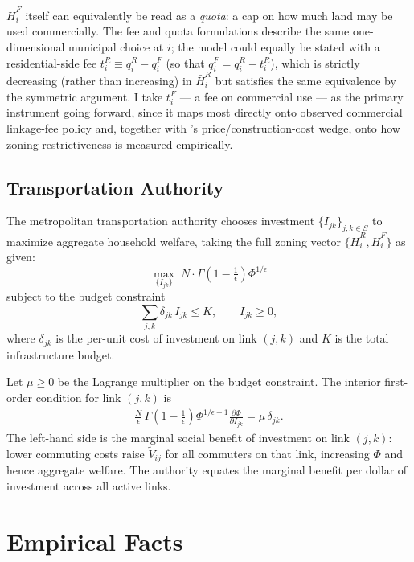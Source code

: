 \documentclass[12pt, a4paper]{article}
\theoremstyle{definition}
\begin{document}
$\bar{H}_i^F$ itself can equivalently be read as a \emph{quota}: a cap on how much land may be used commercially. The fee and quota formulations describe the same one-dimensional municipal choice at $i$; the model could equally be stated with a residential-side fee $t_i^R \equiv q_i^R - q_i^F$ (so that $q_i^F = q_i^R - t_i^R$), which is strictly decreasing (rather than increasing) in $\bar{H}_i^R$ but satisfies the same equivalence by the symmetric argument. I take $t_i^F$ — a fee on commercial use — as the primary instrument going forward, since it maps most directly onto observed commercial linkage-fee policy and, together with \citet{Glaeser2002-vq}'s price/construction-cost wedge, onto how zoning restrictiveness is measured empirically.

\subsection{Transportation Authority}

The metropolitan transportation authority chooses investment $\{I_{jk}\}_{j,k \in S}$ to maximize aggregate household welfare, taking the full zoning vector $\{\bar{H}_i^R, \bar{H}_i^F\}$ as given:
\[
\max_{\{I_{jk}\}}\; N \cdot \Gamma\!\left(1 - \tfrac{1}{\epsilon}\right)\Phi^{1/\epsilon}
\]
subject to the budget constraint
\[
\sum_{j,k} \delta_{jk}\, I_{jk} \leq K, \qquad I_{jk} \geq 0,
\]
where $\delta_{jk}$ is the per-unit cost of investment on link $(j,k)$ and $K$ is the total infrastructure budget.

Let $\mu \geq 0$ be the Lagrange multiplier on the budget constraint. The interior first-order condition for link $(j,k)$ is
\begin{align}
    \label{transit-foc}
\frac{N}{\epsilon}\,\Gamma\!\left(1-\tfrac{1}{\epsilon}\right)\Phi^{1/\epsilon-1}
\frac{\partial\Phi}{\partial I_{jk}} = \mu\,\delta_{jk}.
\end{align}
The left-hand side is the marginal social benefit of investment on link $(j,k)$: lower commuting costs raise $\tilde{V}_{ij}$ for all commuters on that link, increasing $\Phi$ and hence aggregate welfare. The authority equates the marginal benefit per dollar of investment across all active links.

\section{Empirical Facts}
\end{document}
